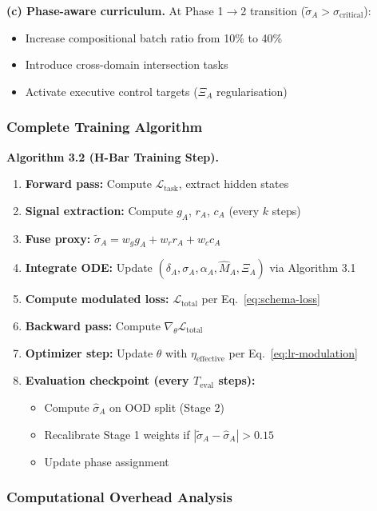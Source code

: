 \documentclass[11pt,a4paper]{article}
\begin{document}
\textbf{(c) Phase-aware curriculum.} At Phase 1$\to$2 transition
($\tilde{\sigma}_A > \sigma_{\text{critical}}$):
\begin{itemize}[nosep]
\item Increase compositional batch ratio from 10\% to 40\%
\item Introduce cross-domain intersection tasks
\item Activate executive control targets ($\Xi_A$ regularisation)
\end{itemize}

\subsubsection{Complete Training Algorithm}

\textbf{Algorithm 3.2 (H-Bar Training Step).}
\begin{enumerate}[nosep]
\item \textbf{Forward pass:} Compute $\mathcal{L}_{\text{task}}$, extract hidden states
\item \textbf{Signal extraction:} Compute $g_A$, $r_A$, $c_A$ (every $k$ steps)
\item \textbf{Fuse proxy:} $\tilde{\sigma}_A = w_g g_A + w_r r_A + w_c c_A$
\item \textbf{Integrate ODE:} Update $(\delta_A, \sigma_A, \alpha_A, \hat{M}_A, \Xi_A)$ via Algorithm 3.1
\item \textbf{Compute modulated loss:} $\mathcal{L}_{\text{total}}$ per Eq.~\ref{eq:schema-loss}
\item \textbf{Backward pass:} Compute $\nabla_\theta \mathcal{L}_{\text{total}}$
\item \textbf{Optimizer step:} Update $\theta$ with $\eta_{\text{effective}}$ per Eq.~\ref{eq:lr-modulation}
\item \textbf{Evaluation checkpoint (every $T_{\text{eval}}$ steps):}
  \begin{itemize}[nosep]
  \item Compute $\hat{\sigma}_A$ on OOD split (Stage 2)
  \item Recalibrate Stage 1 weights if $|\tilde{\sigma}_A - \hat{\sigma}_A| > 0.15$
  \item Update phase assignment
  \end{itemize}
\end{enumerate}

\subsubsection{Computational Overhead Analysis}
\end{document}
